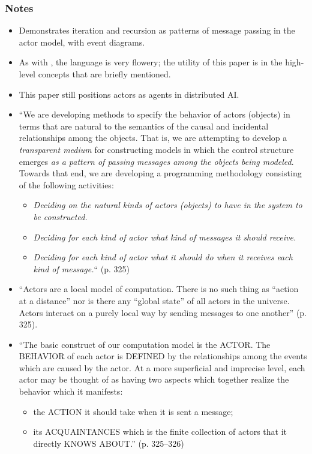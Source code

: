 \subsubsection*{Notes}
\begin{itemize}
\item Demonstrates iteration and recursion as patterns of message passing in the actor model, with event diagrams.
\item As with \cite{Hewitt1973}, the language is very flowery; the utility of this paper is in the high-level concepts that are briefly mentioned.
\item This paper still positions actors as agents in distributed AI.
\item ``We are developing methods to specify the behavior of actors (objects) in terms that are natural to the semantics of the causal and incidental relationships among the objects. That is, we are attempting to develop a \emph{transparent medium} for constructing models in which the control structure emerges \emph{as a pattern of passing messages among the objects being modeled}. Towards that end, we are developing a programming methodology consisting of the following activities:
	\begin{itemize}
	\item \emph{Deciding on the natural kinds of actors (objects) to have in the system to be constructed.}
	\item \emph{Deciding for each kind of actor what kind of messages it should receive.}
	\item \emph{Deciding for each kind of actor what it should do when it receives each kind of message.}`` (p. 325)
	\end{itemize}
\item ``Actors are a local model of computation. There is no such thing as ``action at a distance'' nor is there any ``global state'' of all actors in the universe. Actors interact on a purely local way by sending messages to one another'' (p. 325).
\item ``The basic construct of our computation model is the ACTOR. The BEHAVIOR of each actor is DEFINED by the relationships among the events which are caused by the actor. At a more superficial and imprecise level, each actor may be thought of as having two aspects which together realize the behavior which it manifests:
	\begin{itemize}
	\item the ACTION it should take when it is sent a message;
	\item its ACQUAINTANCES which is the finite collection of actors that it directly KNOWS ABOUT.'' (p. 325--326)

\end{itemize}
\end{itemize}
